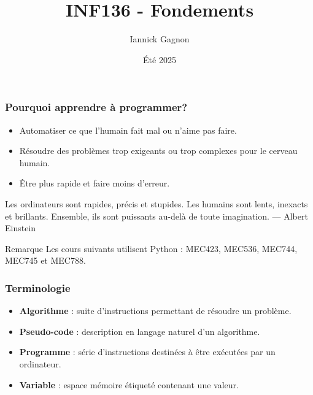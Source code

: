\documentclass{beamer}
\title{INF136 - Fondements}
\author{Iannick Gagnon}
\institute{École de technologie supérieure}
\date{Été 2025}
\begin{document}
\frame{\titlepage}

\begin{frame}[fragile]

    \frametitle{Pourquoi apprendre à programmer?}
    \vspace{1em}
    
    \begin{itemize}
        \item Automatiser ce que l'humain fait mal ou n'aime pas faire.
        \item Résoudre des problèmes trop exigeants ou trop complexes pour le cerveau humain.
        \item Être plus rapide et faire moins d'erreur.
        \newline
    \end{itemize}
    
    \begin{displayquote}
    Les ordinateurs sont rapides, précis et stupides. Les humains sont lents, inexacts et brillants. Ensemble, ils sont puissants au-delà de toute imagination. — Albert Einstein
    \end{displayquote}

    \begin{block}{Remarque}
    Les cours suivants utilisent Python : MEC423, MEC536, MEC744, MEC745 et MEC788.
    \end{block}
    
\end{frame}

\begin{frame}[fragile]

    \frametitle{Terminologie}
    \vspace{1em}
    
    \begin{itemize}
        \item \textbf{Algorithme} : suite d’instructions permettant de résoudre un problème.
        \item \textbf{Pseudo-code} : description en langage naturel d’un algorithme.
        \item \textbf{Programme} : série d’instructions destinées à être exécutées par un ordinateur.
        \item \textbf{Variable} : espace mémoire étiqueté contenant une valeur.
    \end{itemize}
    
\end{frame}
\end{document}
